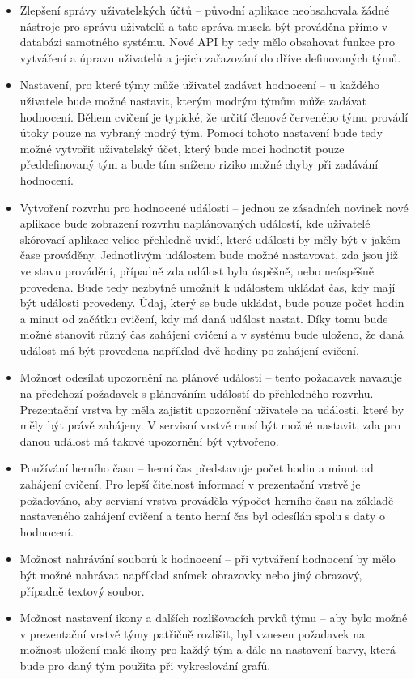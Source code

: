 \documentclass[
  digital, %
  twoside, %
  table,   %
  lof,     %
  lot,     %
]{fithesis3}
\begin{document}
\begin{itemize}
\item Zlepšení správy uživatelských účtů -- původní aplikace neobsahovala žádné nástroje pro správu uživatelů a tato správa musela být prováděna přímo v databázi samotného systému. Nové API by tedy mělo obsahovat funkce pro vytváření a úpravu uživatelů a jejich zařazování do dříve definovaných týmů.
\item Nastavení, pro které týmy může uživatel zadávat hodnocení -- u každého uživatele bude možné nastavit, kterým modrým týmům může zadávat hodnocení. Během cvičení je typické, že určití členové červeného týmu provádí útoky pouze na vybraný modrý tým. Pomocí tohoto nastavení bude tedy možné vytvořit uživatelský účet, který bude moci hodnotit pouze předdefinovaný tým a bude tím sníženo riziko možné chyby při zadávání hodnocení.
\item Vytvoření rozvrhu pro hodnocené události -- jednou ze zásadních novinek nové aplikace bude zobrazení rozvrhu naplánovaných událostí, kde uživatelé skórovací aplikace velice přehledně uvidí, které události by měly být v jakém čase prováděny. Jednotlivým událostem bude možné nastavovat, zda jsou již ve stavu provádění, případně zda událost byla úspěšně, nebo neúspěšně provedena. Bude tedy nezbytné umožnit k událostem ukládat čas, kdy mají být události provedeny. Údaj, který se bude ukládat, bude pouze počet hodin a minut od začátku cvičení, kdy má daná událost nastat. Díky tomu bude možné stanovit různý čas zahájení cvičení a v systému bude uloženo, že daná událost má být provedena například dvě hodiny po zahájení cvičení.
\item Možnost odesílat upozornění na plánové události -- tento požadavek navazuje na předchozí požadavek s plánováním událostí do přehledného rozvrhu. Prezentační vrstva by měla zajistit upozornění uživatele na události, které by měly být právě zahájeny. V servisní vrstvě musí být možné nastavit, zda pro danou událost má takové upozornění být vytvořeno.
\item Používání herního času -- herní čas představuje počet hodin a minut od zahájení cvičení. Pro lepší čitelnost informací v prezentační vrstvě je požadováno, aby servisní vrstva prováděla výpočet herního času na základě nastaveného zahájení cvičení a tento herní čas byl odesílán spolu s daty o hodnocení.
\item Možnost nahrávání souborů k hodnocení – při vytváření hodnocení by mělo být možné nahrávat například snímek obrazovky nebo jiný obrazový, případně textový soubor.
\item Možnost nastavení ikony a dalších rozlišovacích prvků týmu -- aby bylo možné v prezentační vrstvě týmy patřičně rozlišit, byl vznesen požadavek na možnost uložení malé ikony pro každý tým a dále na nastavení barvy, která bude pro daný tým použita při vykreslování grafů.
\end{itemize}
\end{document}
